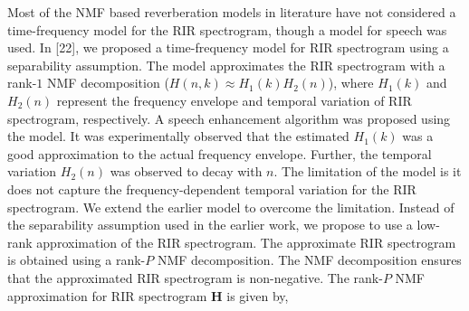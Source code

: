 Most of the NMF based reverberation models in literature have not considered a time-frequency model for the RIR spectrogram, though a model for speech was used. In [22], we proposed a time-frequency model for RIR spectrogram using a separability assumption. The model approximates the RIR spectrogram with a rank-$1$ NMF decomposition ($H(n, k) \approx H_1(k)H_2(n)$), where $H_1(k)$ and $H_2(n)$ represent the frequency envelope and temporal variation of RIR spectrogram, respectively. A speech enhancement algorithm was proposed using the model. It was experimentally observed that the estimated $H_1(k)$ was a good approximation to the actual frequency envelope. Further, the temporal variation $H_2(n)$ was observed to decay with $n$. The limitation of the model is it does not capture the frequency-dependent temporal variation for the RIR spectrogram. We extend the earlier model to overcome the limitation. Instead of the separability assumption used in the earlier work, we propose to use a low-rank approximation of the RIR spectrogram. The approximate RIR spectrogram is obtained using a rank-$P$ NMF decomposition. The NMF decomposition ensures that the approximated RIR spectrogram is non-negative.
The rank-$P$ NMF approximation for RIR spectrogram $\mathbf{H}$ is given by,
